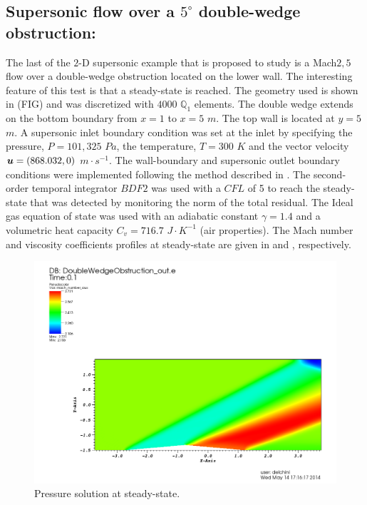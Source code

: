 \subsection{Supersonic flow over a $5^\circ$ double-wedge obstruction:} \label{sec:double_wedge}
The last of the $2$-D supersonic example that is proposed to study is a Mach$2,5$ flow over a double-wedge obstruction located on the lower wall. The interesting feature of this test is that a steady-state is reached. The geometry used is shown in (FIG) and was discretized with $4000$ $\mathbb Q_1$ elements. The double wedge extends on the bottom boundary from $x=1$ to $x=5$  $m$. The top wall is located at $y=5$ $m$. A supersonic inlet boundary condition was set at the inlet by specifying the pressure, $P=101,325$ $Pa$, the temperature, $T=300$ $K$ and the vector velocity $\boldsymbol u = (868.032, 0)$ $m \cdot s^{-1}$. The wall-boundary and supersonic outlet boundary conditions were implemented following the method described in . The second-order temporal integrator $BDF2$ was used with a $CFL$ of 5 to reach the steady-state that was detected by monitoring the norm of the total residual. The Ideal gas equation of state was used with an adiabatic constant $\gamma = 1.4$ and a volumetric heat capacity $C_v = 716.7$ $J \cdot K^{-1}$ (air properties). The Mach number and viscosity coefficients profiles at steady-state are given in  and , respectively. 
        \begin{figure}[H]%
                \centering
                \includegraphics[scale=.50]{figures/DWOMachNumberStt.png}
                \caption{Pressure solution at steady-state.}
                \label{fig:2d_dbwd_stt}
        \end{figure}%
